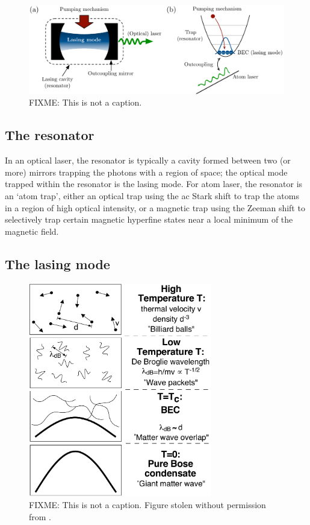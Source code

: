 \begin{figure}
    \centering
    \includegraphics[width=14cm]{LaserAtomLaserComparison}
    \caption{
        \label{Introduction:LaserAtomLaserComparison}
        FIXME: This is not a caption.
    }
\end{figure}

\subsection{The resonator}

In an optical laser, the resonator is typically a cavity formed between two (or more) mirrors trapping the photons with a region of space; the optical mode trapped within the resonator is the lasing mode.  For atom laser, the resonator is an `atom trap', either an optical trap using the ac Stark shift to trap the atoms in a region of high optical intensity, or a magnetic trap using the Zeeman shift to selectively trap certain magnetic hyperfine states near a local minimum of the magnetic field.

\subsection{The lasing mode}

\begin{figure}
    \centering
    \includegraphics[width=8cm]{WhatIsBEC}
    \caption{
        \label{Introduction:WhatIsBEC}
        FIXME: This is not a caption.  Figure stolen without permission from \citep{Ketterle:1999fk}.
    }
\end{figure}

